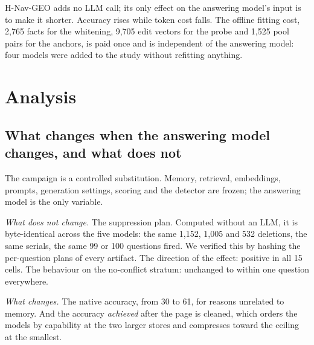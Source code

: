 \documentclass[journal=jcisd8,manuscript=article]{achemso}
\begin{document}
\begin{table}[H]\centering\small
\caption{Plan and cost per subset; identical for every answering model.}\label{tab:cost}
\end{table}

H-Nav-GEO adds no LLM call; its only effect on the answering model's input is to make it shorter. Accuracy rises while token cost falls. The offline fitting cost, 2,765 facts for the whitening, 9,705 edit vectors for the probe and 1,525 pool pairs for the anchors, is paid once and is independent of the answering model: four models were added to the study without refitting anything.

\section{Analysis}
\label{sec:analysis}

\subsection{What changes when the answering model changes, and what does not}
\label{sec:substitution}

The campaign is a controlled substitution. Memory, retrieval, embeddings, prompts, generation settings, scoring and the detector are frozen; the answering model is the only variable.

\emph{What does not change.} The suppression plan. Computed without an LLM, it is byte-identical across the five models: the same 1,152, 1,005 and 532 deletions, the same serials, the same 99 or 100 questions fired. We verified this by hashing the per-question plans of every artifact. The direction of the effect: positive in all 15 cells. The behaviour on the no-conflict stratum: unchanged to within one question everywhere.

\emph{What changes.} The native accuracy, from 30 to 61, for reasons unrelated to memory. And the accuracy \emph{achieved} after the page is cleaned, which orders the models by capability at the two larger stores and compresses toward the ceiling at the smallest.
\end{document}

